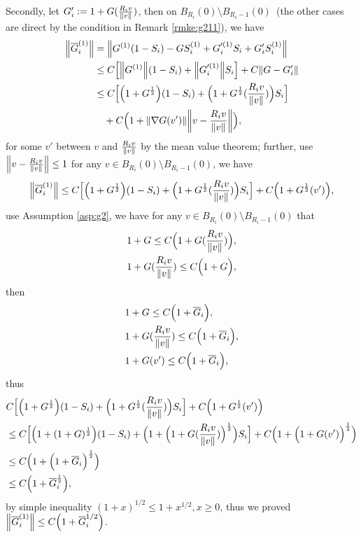\documentclass[a4paper, 11pt]{article}
\theoremstyle{plain}
\theoremstyle{remark}
\theoremstyle{definition}
\begin{document}
Secondly, let $G_i':=1+G(\frac{R_iv}{\norm{v}})$, then on $B_{R_i}(0)\setminus B_{R_i-1}(0)$~(the other cases are direct by the condition in Remark \ref{rmke:g211}), we have
\begin{equation}
\begin{aligned}
    \norm{\overline{G}_i^{(1)}}&=\norm{G^{(1)}(1-S_i)-GS_i^{(1)}+G_i'^{(1)}S_i+G_i'S_i^{(1)}}\\
    &\leq C\Big[\norm{G^{(1)}}(1-S_i)+\norm{G_i'^{(1)}}S_i\Big]+C\norm{G-G_i'}\\
    &\leq C\Big[\Big(1+G^{\frac{1}{2}}\Big)(1-S_i)+\Big(1+G^{\frac{1}{2}}(\frac{R_iv}{\norm{v}})\Big)S_i\Big]\\
    &\quad+C\Big(1+\norm{\nabla G(v')}\norm{v-\frac{R_iv}{\norm{v}}}\Big),
\end{aligned}
\end{equation}
for some $v'$ between $v$ and $\frac{R_iv}{\norm{v}}$ by the mean value theorem; further, use $\norm{v-\frac{R_iv}{\norm{v}}}\leq 1$ for any $v\in B_{R_i}(0)\setminus B_{R_i-1}(0)$, we have
\begin{equation}
    \norm{\overline{G}_i^{(1)}}\leq C\Big[\Big(1+G^{\frac{1}{2}}\Big)(1-S_i)+\Big(1+G^{\frac{1}{2}}(\frac{R_iv}{\norm{v}})\Big)S_i\Big]+C\Big(1+G^{\frac{1}{2}}(v')\Big),
\end{equation}
use Assumption \ref{asp:g2}, we have for any $v\in B_{R_i}(0)\setminus B_{R_i-1}(0)$ that
\begin{eqnarray}
    &1+G\leq C\Big(1+G(\frac{R_iv}{\norm{v}})\Big),\\
    &1+G(\frac{R_iv}{\norm{v}})\leq C\Big(1+G\Big),
\end{eqnarray}
then 
\begin{eqnarray}
    &1+G\leq C\Big(1+\overline{G}_i\Big),\\
    &1+G(\frac{R_iv}{\norm{v}})\leq C\Big(1+\overline{G}_i\Big),\\
    &1+G(v')\leq C\Big(1+\overline{G}_i\Big),
\end{eqnarray}
thus
\begin{equation}
   \begin{aligned}
        &C\Big[\Big(1+G^{\frac{1}{2}}\Big)(1-S_i)+\Big(1+G^{\frac{1}{2}}(\frac{R_iv}{\norm{v}})\Big)S_i\Big]+C\Big(1+G^{\frac{1}{2}}(v')\Big)\\
        &\leq C\Big[\Big(1+(1+G)^{\frac{1}{2}}\Big)(1-S_i)+\Big(1+\Big(1+G(\frac{R_iv}{\norm{v}})\Big)^{\frac{1}{2}}\Big)S_i\Big]+C\Big(1+\Big(1+G(v')\Big)^{\frac{1}{2}}\Big)\\
        &\leq C\Big(1+\Big(1+\overline{G}_i\Big)^{\frac{1}{2}}\Big)\\
        &\leq C\Big(1+\overline{G}_i^{\frac{1}{2}}\Big),
   \end{aligned}
\end{equation}
by simple inequality $(1+x)^{1/2}\leq 1+x^{1/2},x\geq 0$, thus we proved $\norm{\overline{G}_i^{(1)}}\leq C\Big(1+\overline{G}_i^{{1}/{2}}\Big)$.
\end{document}
